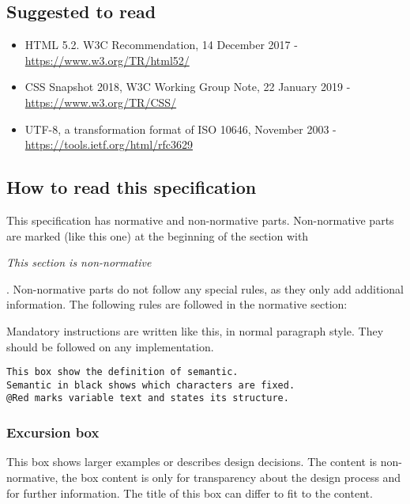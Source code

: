 \documentclass[12pt,a4paper]{article}
\begin{document}
\subsection{Suggested to read}

\begin{itemize}
\item HTML 5.2. W3C Recommendation, 14 December 2017 - \url{https://www.w3.org/TR/html52/}
\item CSS Snapshot 2018, W3C Working Group Note, 22 January 2019 - \url{https://www.w3.org/TR/CSS/}
\item UTF-8, a transformation format of ISO 10646, November 2003 - \url{https://tools.ietf.org/html/rfc3629}
\end{itemize}

\subsection{How to read this specification}

This specification has normative and non-normative parts. Non-normative parts are marked (like this one) at the beginning of the section with \begin{small}\textit{This section is non-normative}\end{small}. Non-normative parts do not follow any special rules, as they only add additional information. The following rules are followed in the normative section:

Mandatory instructions are written like this, in normal paragraph style. They should be followed on any implementation.

\begin{lstlisting}[frame=single,style=base]
This box show the definition of semantic.
Semantic in black shows which characters are fixed.
@Red marks variable text and states its structure.
\end{lstlisting}

\begin{tcolorbox}
\subsubsection*{Excursion box}
This box shows larger examples or describes design decisions. The content is non-normative, the box content is only for transparency about the design process and for further information. The title of this box can differ to fit to the content.
\end{tcolorbox}
\end{document}
